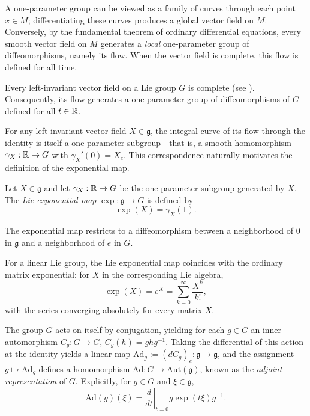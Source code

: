 A one-parameter group can be viewed as a family of curves through each point $x \in M$; differentiating these curves produces a global vector field on $M$. Conversely, by the fundamental theorem of ordinary differential equations, every smooth vector field on $M$ generates a \emph{local} one-parameter group of diffeomorphisms, namely its flow. When the vector field is complete, this flow is defined for all time.

\begin{lemma}
    Every left-invariant vector field on a Lie group $G$ is complete (see \cite[Thm.\ 8.3.1]{barden2003introduction}). Consequently, its flow generates a one-parameter group of diffeomorphisms of $G$ defined for all $t \in \mathbb{R}$.
\end{lemma}

For any left-invariant vector field $X \in \mathfrak{g}$, the integral curve of its flow through the identity is itself a one-parameter subgroup---that is, a smooth homomorphism $\gamma_X : \mathbb{R} \to G$ with $\gamma_X'(0) = X_e$. This correspondence naturally motivates the definition of the exponential map.

\begin{definition}
    Let $X \in \mathfrak{g}$ and let $\gamma_X : \mathbb{R} \to G$ be the one-parameter subgroup generated by $X$. The \emph{Lie exponential map} $\exp : \mathfrak{g} \to G$ is defined by
    \[
        \exp(X) = \gamma_X(1).
    \]
\end{definition}

The exponential map restricts to a diffeomorphism between a neighborhood of $0$ in $\mathfrak{g}$ and a neighborhood of $e$ in $G$.

For a linear Lie group, the Lie exponential map coincides with the ordinary matrix exponential: for $X$ in the corresponding Lie algebra,
\[
    \exp(X) = e^X = \sum_{k=0}^{\infty} \frac{X^k}{k!},
\]
with the series converging absolutely for every matrix $X$.

The group $G$ acts on itself by conjugation, yielding for each $g \in G$ an inner automorphism $C_g : G \to G$, $C_g(h) = ghg^{-1}$. Taking the differential of this action at the identity yields a linear map $\mathrm{Ad}_g := (dC_g)_e : \mathfrak{g} \to \mathfrak{g}$, and the assignment $g \mapsto \mathrm{Ad}_g$ defines a homomorphism $\mathrm{Ad} : G \to \mathrm{Aut}(\mathfrak{g})$, known as the \emph{adjoint representation} of $G$. Explicitly, for $g \in G$ and $\xi \in \mathfrak{g}$,
\[
    \mathrm{Ad}(g)(\xi) = \left.\frac{d}{dt}\right|_{t=0} g \exp(t\xi) g^{-1}.
\]

